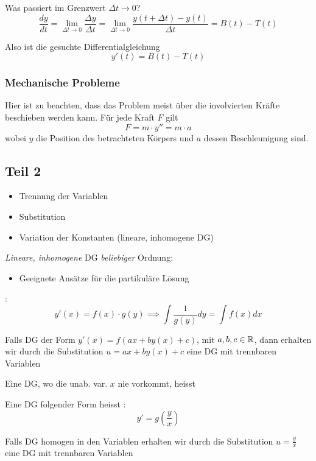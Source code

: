 Was passiert im Grenzwert $\Delta t \to 0$?
$$\frac{dy}{dt} = \lim_{\Delta t \to 0} \frac{\Delta y}{\Delta t} = \lim_{\Delta t \to 0}\frac{y(t + \Delta t) - y(t)}{\Delta t} = B(t) - T(t)$$

Also ist die gesuchte Differentialgleichung
$$y'(t) = B(t) - T(t)$$

\subsubsection{Mechanische Probleme}

Hier ist zu beachten, dass das Problem meist über die involvierten Kräfte beschieben werden kann.
Für jede Kraft $F$ gilt
$$F = m \cdot y'' = m \cdot a$$
wobei $y$ die Position des betrachteten Körpers und $a$ dessen Beschleunigung sind.

\subsection{Teil 2}

\begin{itemize}
    \item Trennung der Variablen
    \item Substitution
    \item Variation der Konstanten (lineare, inhomogene DG)
\end{itemize}
\textit{Lineare, inhomogene} DG \textit{beliebiger} Ordnung:
\vspace{-0.6em}
\begin{itemize}
    \item Geeignete Ansätze für die partikuläre Lösung
\end{itemize}

\Satz {}:
$$y'(x) = f(x) \cdot g(y) \implies \int \frac{1}{g(y)} dy = \int f(x) dx$$

\Satz {} Falls DG der Form
$y'(x) = f(ax + by(x) + c)$, mit $a, b, c \in \mathbb{R}$, dann erhalten wir durch die
Substitution $u = ax + by(x) + c$ eine DG mit trennbaren Variablen

\Def Eine DG, wo die unab. var. $x$ nie vorkommt, heisst 

\Def Eine DG folgender Form heisst :
$$y' = g\left(\frac{y}{x}\right)$$

\Satz {} Falls DG homogen in den Variablen
erhalten wir durch die Substitution $u = \frac{y}{x}$ eine DG mit trennbaren Variablen

